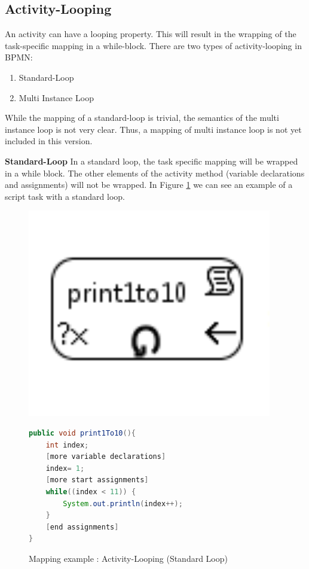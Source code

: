 \subsection{Activity-Looping}
An activity can have a looping property. This will result in the wrapping of the task-specific mapping in a while-block. 
There are two types of activity-looping in BPMN:
\begin{enumerate}
	\item Standard-Loop
	\item Multi Instance Loop
\end{enumerate}
While the mapping of a standard-loop is trivial, the semantics of the multi instance loop is not very clear. Thus, a mapping of multi instance loop is not yet included in this version.
 
\textbf{Standard-Loop}
In a standard loop, the task specific mapping will be wrapped in a while block. The other elements of the activity method (variable declarations and assignments) will not be wrapped.  In Figure \ref{fig:mapping_standardLoop} we can see an example of a script task with a standard loop.
\begin{figure}[h]
\begin{minipage}[c]{0.3\textwidth}
\includegraphics[width=0.95\textwidth]{images/mapping/standard_loop.png}
\end{minipage}
\begin{minipage}[c]{0.7\textwidth}
\begin{lstlisting}[language=Java]
public void print1To10(){
	int index;
	[more variable declarations]
	index= 1;
	[more start assignments]
	while((index < 11)) {
		System.out.println(index++);
	}
	[end assignments]
}
\end{lstlisting}
\end{minipage}
\caption{Mapping example : Activity-Looping (Standard Loop)}%
\label{fig:mapping_standardLoop}%
\end{figure}
\newpage
